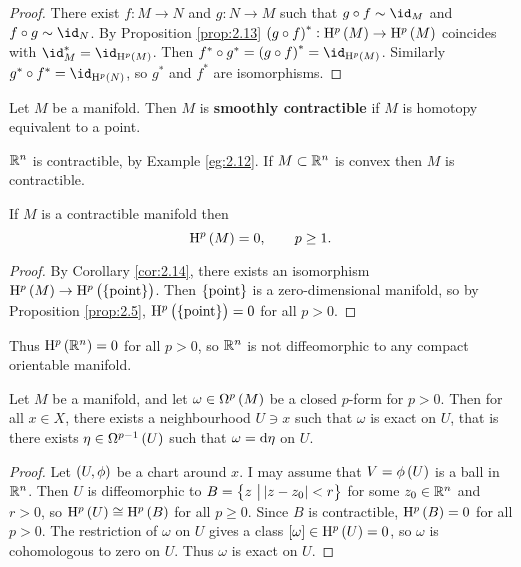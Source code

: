 \begin{proof}
There exist $ f : M \to N $ and $ g : N \to M $ such that $ g \circ f \sim \id_M $ and $ f \circ g \sim \id_N $. By Proposition \ref{prop:2.13} $ \br{g \circ f}^* : \H^p\br{M} \to \H^p\br{M} $ coincides with $ \id_M^* = \id_{\H^p\br{M}} $. Then $ f^* \circ g^* = \br{g \circ f}^* = \id_{\H^p\br{M}} $. Similarly $ g^* \circ f^* = \id_{\H^p\br{N}} $, so $ g^* $ and $ f^* $ are isomorphisms.
\end{proof}

\begin{definition}
Let $ M $ be a manifold. Then $ M $ is \textbf{smoothly contractible} if $ M $ is homotopy equivalent to a point.
\end{definition}

\begin{example*}
$ \mathbb{R}^n $ is contractible, by Example \ref{eg:2.12}. If $ M \subset \mathbb{R}^n $ is convex then $ M $ is contractible.
\end{example*}

\begin{theorem}
If $ M $ is a contractible manifold then
$$ \H^p\br{M} = 0, \qquad p \ge 1. $$
\end{theorem}

\begin{proof}
By Corollary \ref{cor:2.14}, there exists an isomorphism $ \H^p\br{M} \to \H^p\br{\cbr{\text{point}}} $. Then $ \cbr{\text{point}} $ is a zero-dimensional manifold, so by Proposition \ref{prop:2.5}, $ \H^p\br{\cbr{\text{point}}} = 0 $ for all $ p > 0 $.
\end{proof}

\pagebreak

Thus $ \H^p\br{\RR^n} = 0 $ for all $ p > 0 $, so $ \mathbb{R}^n $ is not diffeomorphic to any compact orientable manifold.


\begin{proposition}
Let $ M $ be a manifold, and let $ \omega \in \Omega^p\br{M} $ be a closed $ p $-form for $ p > 0 $. Then for all $ x \in X $, there exists a neighbourhood $ U \ni x $ such that $ \omega $ is exact on $ U $, that is there exists $ \eta \in \Omega^{p - 1}\br{U} $ such that $ \omega = \mathrm{d}\eta $ on $ U $.
\end{proposition}

\begin{proof}
Let $ \br{U, \phi} $ be a chart around $ x $. I may assume that $ V = \phi\br{U} $ is a ball in $ \mathbb{R}^n $. Then $ U $ is diffeomorphic to $ B = \cbr{z \st \abs{z - z_0} < r} $ for some $ z_0 \in \mathbb{R}^n $ and $ r > 0 $, so $ \H^p\br{U} \cong \H^p\br{B} $ for all $ p \ge 0 $. Since $ B $ is contractible, $ \H^p\br{B} = 0 $ for all $ p > 0 $. The restriction of $ \omega $ on $ U $ gives a class $ \sbr{\omega} \in \H^p\br{U} = 0 $, so $ \omega $ is cohomologous to zero on $ U $. Thus $ \omega $ is exact on $ U $.
\end{proof}


